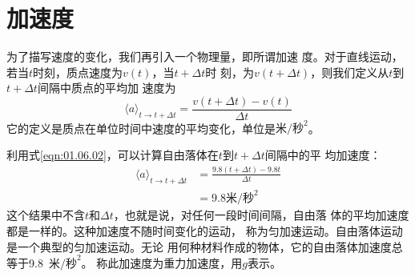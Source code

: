 \section{加速度}\label{sec:01.08}

为了描写速度的变化，我们再引入一个物理量，即所谓加速
度。对于直线运动，若当$t$时刻，质点速度为$v\left(t\right)$，当$t+\Delta t$时
刻，为$v\left(t+\Delta t\right)$，则我们定义从$t$到$t+\Delta t$间隔中质点的平均加
速度为
\vspace{-1em}\begin{equation}\label{eqn:01.08.01}
    \langle a\rangle_{t\rightarrow t+\Delta t} = \frac{v\left(t+\Delta t\right)-v\left(t\right)}{\Delta t}
\end{equation}
它的定义是质点在单位时间中速度的平均变化，单位是$\text{米/秒}^2$。

利用式\eqref{eqn:01.06.02}，可以计算自由落体在$t$到$t+\Delta t$间隔中的平
均加速度：
\vspace{-0.5em}\begin{equation*}
    \begin{aligned}
        \langle a\rangle_{t\rightarrow t+\Delta t} & = \frac{9.8\left(t+\Delta t\right)-9.8t}{\Delta t} \\
                                                   & = 9.8\text{米/秒}^2
    \end{aligned}
\end{equation*}
这个结果中不含$t$和$\Delta t$，也就是说，对任何一段时间间隔，自由落
体的平均加速度都是一样的。这种加速度不随时间变化的运动，
称为匀加速运动。自由落体运动是一个典型的匀加速运动。无论
用何种材料作成的物体，它的自由落体加速度总等于9.8~$\text{米/秒}^2$。
称此加速度为重力加速度，用$g$表示。

